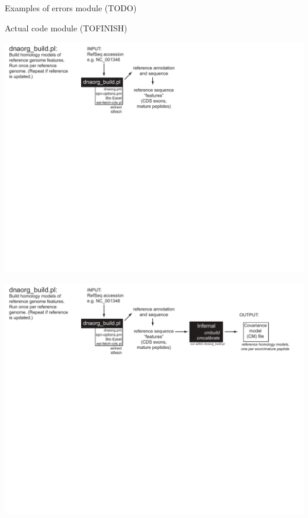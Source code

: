 \documentclass[landscape]{slides}
\begin{document}
\begin{slide}

Examples of errors module (TODO)
\vfill
\end{slide}
\begin{slide}

Actual code module (TOFINISH)
\vfill
\end{slide}
\begin{slide}
\includegraphics[width=10in]{figs/dnaorg-scripts-build1}
\vfill
\end{slide}
\begin{slide}
\includegraphics[width=10in]{figs/dnaorg-scripts-build2}
\vfill
\end{slide}
\end{document}
